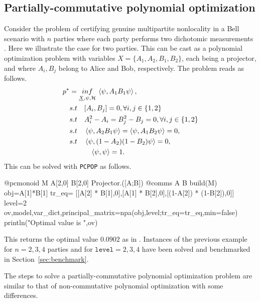 \subsection{Partially-commutative polynomial optimization}
\label{sec:pcpop}
\begin{example}
\label{ex:pcpop_hardy}
Consider the problem of certifying genuine multipartite nonlocality in a Bell scenario with $n$ parties where each party performs two dichotomic measurements \cite{PhysRevA.110.L010401}. Here we illustrate the case for two parties. This can be cast as a polynomial optimization problem with variables $X=\{A_1,A_2,B_1,B_2\}$, each being a projector, and where $A_i,B_j$ belong to Alice and Bob, respectively. The problem reads as follows.
\begin{equation}
   \begin{split}
       p^* &=\underset{\underline{X} , \psi , \mathcal{H}}{inf} \: \braket{\psi, A_1  B_1 \psi}, \\
    & s.t \quad [A_i,B_j] =0, \forall i,j \in \{1,2\}\\
    & s.t \quad A_i^2-A_i = B_j^2-B_j = 0, \forall i,j \in \{1,2\} \\
    & s.t \quad \braket{\psi, A_2  B_1 \psi} = \braket{\psi, A_1  B_2 \psi} = 0, \\
    & s.t \quad \braket{\psi, (1-A_2)  (1-B_2) \psi} = 0, \\
    & \qquad \quad \braket{\psi , \psi} = 1. \\ 
\end{split}
\end{equation} 
This can be solved with \texttt{PCPOP} as follows.
\begin{code}
    @pcmonoid M A[2,0] B[2,0]
    Projector.([A;B])
    @comms A B
    build(M)
    obj=A[1]*B[1]
    tr_eq= [[A[2] * B[1],0],[A[1] * B[2],0],[(1-A[2]) * (1-B[2]),0]]
    level=2
    ov,model,var_dict,principal_matrix=npa(obj,level;tr_eq=tr_eq,min=false)
    println("Optimal value is ",ov)
\end{code}
This returns the optimal value $0.0902$ as in \cite{PhysRevA.110.L010401}. Instances of the previous example for $n=2,3,4$ parties and for $\texttt{level}=2,3,4$ have been solved and benchmarked in Section~\ref{sec:benchmark}.
\end{example}
The steps to solve a partially-commutative polynomial optimization problem are similar to that of non-commutative polynomial optimization with some differences.
